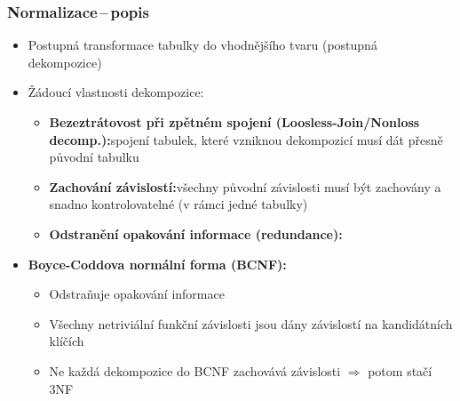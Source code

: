 \documentclass[a4paper,10pt]{article}
\newcommand{\pojem}[2]{\item \textbf{#1:}\quad #2}
\newcommand{\tedy}{$\Rightarrow$ }
\begin{document}
			\subsubsection{Normalizace\,--\,popis}
				\begin{itemize}
					\item Postupná transformace tabulky do vhodnějšího tvaru (postupná dekompozice)
					\item Žádoucí vlastnosti dekompozice:
					\begin{itemize}
						\pojem{Bezeztrátovost při zpětném spojení (Loosless-Join/Nonloss decomp.)}{spojení tabulek, které vzniknou dekompozicí musí dát přesně původní tabulku}
						\pojem{Zachování závislostí}{všechny původní závislosti musí být zachovány a snadno kontrolovatelné (v rámci jedné tabulky)}
						\pojem{Odstranění opakování informace (redundance)}
					\end{itemize}
					\pojem{Boyce-Coddova normální forma (BCNF)}
					\begin{itemize}
						\item Odstraňuje opakování informace
						\item Všechny netriviální funkční závislosti jsou dány závislostí na kandidátních klíčích
						\item Ne každá dekompozice do BCNF zachovává závislosti \tedy potom stačí 3NF
					\end{itemize}
				\end{itemize}
\end{document}
